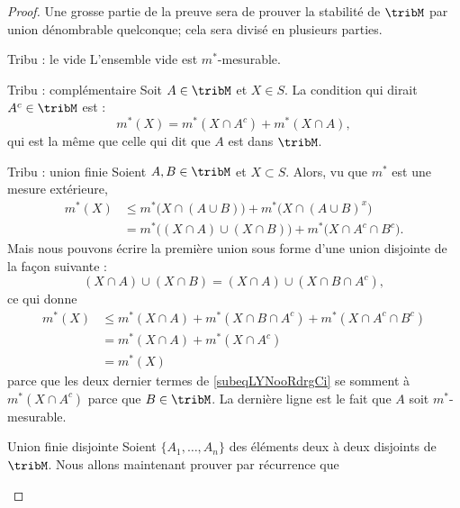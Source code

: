 \begin{proof}
    Une grosse partie de la preuve sera de prouver la stabilité de \( \tribM\) par union dénombrable quelconque; cela sera divisé en plusieurs parties.
    \begin{subproof}
    \item[Tribu : le vide]
        L'ensemble vide est \( m^*\)-mesurable.
    \item[Tribu : complémentaire]
        Soit \( A\in\tribM\) et \( X\in S\). La condition qui dirait \( A^c\in\tribM\) est :
        \begin{equation}
            m^*(X)=m^*(X\cap A^c)+m^*(X\cap A),
        \end{equation}
        qui est la même que celle qui dit que \( A\) est dans \( \tribM\).
    \item[Tribu : union finie]
        Soient \( A,B\in\tribM\) et \( X\subset S\). Alors, vu que \( m^*\) est une mesure extérieure,
        \begin{subequations}
            \begin{align}
                m^*(X)&\leq m^*\big( X\cap(A\cup B) \big)+m^*\big( X\cap (A\cup B)^x \big)\\
                &=m^*\big( (X\cap A)\cup(X\cap B) \big)+m^*\big( X\cap A^c\cap B^c \big).
            \end{align}
        \end{subequations}
        Mais nous pouvons écrire la première union sous forme d'une union disjointe de la façon suivante :
        \begin{equation}
            (X\cap A)\cup(X\cap B)=(X\cap A)\cup(X\cap B\cap A^c),
        \end{equation}
        ce qui donne 
        \begin{subequations}
            \begin{align}
                m^*(X)&\leq m^*(X\cap A)+m^*(X\cap B\cap A^c)+m^*(X\cap A^c\cap B^c)        \label{subeqLYNooRdrgCi}\\
                &=m^*(X\cap A)+m^*(X\cap A^c)\\
                &=m^*(X)
            \end{align}
        \end{subequations}
        parce que les deux dernier termes de \eqref{subeqLYNooRdrgCi} se somment à \( m^*(X\cap A^c)\) parce que \( B\in \tribM\). La dernière ligne est le fait que \( A\) soit \( m^*\)-mesurable.
    \item[Union finie disjointe]
        Soient \( \{ A_1,\ldots, A_n \}\) des éléments deux à deux disjoints de \( \tribM\). Nous allons maintenant prouver par récurrence que

\end{subproof}
\end{proof}
